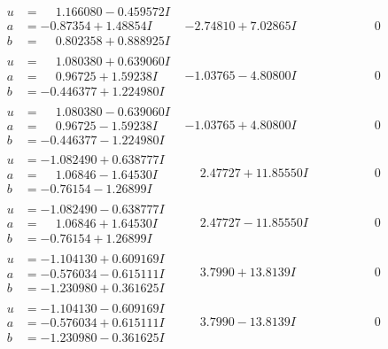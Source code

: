 \documentclass[1p]{elsarticle_modified}
\theoremstyle{definition}
\begin{document}
$$\begin{array}{c|c|c}
\begin{aligned}
u &= \phantom{-}1.166080 - 0.459572 I \\
a &= -0.87354 + 1.48854 I \\
b &= \phantom{-}0.802358 + 0.888925 I\end{aligned}
 & -2.74810 + 7.02865 I & \phantom{-0.000000 } 0 \\ \hline\begin{aligned}
u &= \phantom{-}1.080380 + 0.639060 I \\
a &= \phantom{-}0.96725 + 1.59238 I \\
b &= -0.446377 + 1.224980 I\end{aligned}
 & -1.03765 - 4.80800 I & \phantom{-0.000000 } 0 \\ \hline\begin{aligned}
u &= \phantom{-}1.080380 - 0.639060 I \\
a &= \phantom{-}0.96725 - 1.59238 I \\
b &= -0.446377 - 1.224980 I\end{aligned}
 & -1.03765 + 4.80800 I & \phantom{-0.000000 } 0 \\ \hline\begin{aligned}
u &= -1.082490 + 0.638777 I \\
a &= \phantom{-}1.06846 - 1.64530 I \\
b &= -0.76154 - 1.26899 I\end{aligned}
 & \phantom{-}2.47727 + 11.85550 I & \phantom{-0.000000 } 0 \\ \hline\begin{aligned}
u &= -1.082490 - 0.638777 I \\
a &= \phantom{-}1.06846 + 1.64530 I \\
b &= -0.76154 + 1.26899 I\end{aligned}
 & \phantom{-}2.47727 - 11.85550 I & \phantom{-0.000000 } 0 \\ \hline\begin{aligned}
u &= -1.104130 + 0.609169 I \\
a &= -0.576034 - 0.615111 I \\
b &= -1.230980 + 0.361625 I\end{aligned}
 & \phantom{-}3.7990 + 13.8139 I & \phantom{-0.000000 } 0 \\ \hline\begin{aligned}
u &= -1.104130 - 0.609169 I \\
a &= -0.576034 + 0.615111 I \\
b &= -1.230980 - 0.361625 I\end{aligned}
 & \phantom{-}3.7990 - 13.8139 I & \phantom{-0.000000 } 0 \\ \hline\begin{aligned}

\end{aligned}
\end{array}$$
\end{document}
